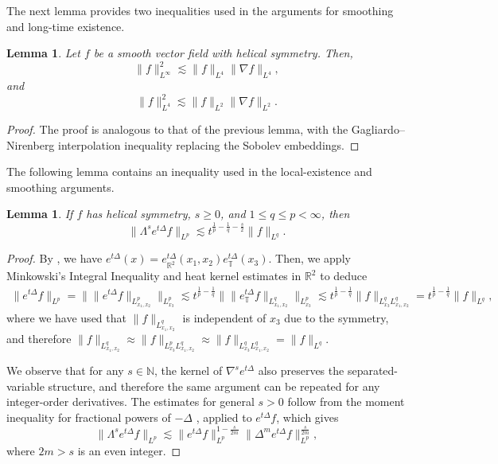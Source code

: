 \documentclass[11pt,a4paper]{article}
\newcommand{\na}{\nabla}
\newcommand{\N}{\mathbb{N}}
\newcommand{\R}{\mathbb{R}}
\newcommand{\T}{\mathbb{T}}
\newcommand{\norm}[1]{\|#1\|}
\def\heat#1{e^{#1 \Delta}}
\newtheorem{lemma}[thm]{Lemma}
\begin{document}
The next lemma provides two inequalities used in the arguments for smoothing and long-time existence.

\begin{lemma}\label{lem:gagliardoniremberg}
Let $f$ be a smooth vector field with helical symmetry. Then,
$$\|f\|^2_{L^\infty}\lesssim \|f\|_{L^4}\|\na f\|_{L^4},$$
and
$$\|f\|^2_{L^4}\lesssim \|f\|_{L^2}\|\na f\|_{L^2}.$$
\end{lemma}
\begin{proof}
The proof is analogous to that of the previous lemma, with the Gagliardo–Nirenberg interpolation inequality replacing the Sobolev embeddings.
\end{proof}

The following lemma contains an inequality used in the local-existence and smoothing arguments.

\begin{lemma}\label{lemma:heathelicalestimates}
If $f$ has helical symmetry, $s\geq 0$, and $1\leq q\leq p< \infty$, then 
$$\|\Lambda^s e^{t\Delta}f\|_{L^p}\lesssim t^{\frac{1}{p}-\frac{1}{q}-\frac{s}{2}}\|f\|_{L^q}.$$
\end{lemma}
\begin{proof}
By \cite[Lemma A.6]{GH-T2023}, we have $\heat{t}(x)=\heat{t}_{\R^2}(x_1,x_2)\heat{t}_\T(x_3)$. Then, we apply Minkowski's Integral Inequality and heat kernel estimates in $\R^2$ to deduce
$$
\begin{aligned}
\|\heat{t}f\|_{L^p}=\|\|\heat{t}f\|_{L^p_{x_1,x_2}}\|_{L^p_{x_3}}\!\lesssim t^{\frac{1}{p}-\frac{1}{q}}\|\|{\heat{t}_\T}f\|_{L^q_{x_1,x_2}}\|_{L^p_{x_3}}
\!\lesssim t^{\frac{1}{p}-\frac{1}{q}}\|f\|_{L^q_{x_3}L^q_{x_1,x_2}}=t^{\frac{1}{p}-\frac{1}{q}}\|f\|_{L^q},
\end{aligned}
$$
where we have used that $\|f\|_{L^q_{x_1,x_2}}$ is independent of $x_3$ due to the symmetry, and therefore $\|f\|_{L^q_{x_1,x_2}}\approx\|f\|_{L^p_{x_3}L^q_{x_1,x_2}}\approx \|f\|_{L^q_{x_3}L^q_{x_1,x_2}}=\|f\|_{L^q}$. 

We observe that for any $s\in \N$, the kernel of $\na^s \heat{t}$ also preserves the separated-variable structure, and therefore the same argument can be repeated for any integer-order derivatives. The estimates for general $s>0$ follow from the moment inequality
for fractional powers of $-\Delta$
\cite[Proposition~6.6.4]{Haase2006}, applied to $e^{t\Delta}f$, which gives 
$$\norm{\Lambda^se^{t\Delta}f}_{L^p}\lesssim\norm{e^{t\Delta}f}_{L^p}^{1-\frac{s}{2m}}
\norm{\Delta^m e^{t\Delta}f}_{L^p}^{\frac{s}{2m}},$$
where $2m> s$ is an even integer. 
\end{proof}
\end{document}
